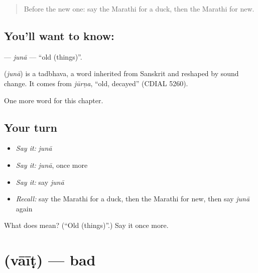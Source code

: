 \label{lesson:MR-C103-juna}



\begin{quote}
Before the new one: say the Marathi for a duck, then the Marathi for new.
\end{quote}

\subsection*{You'll want to know: }
\textbf{} — \emph{junā} — \textquotedblleft{}old (things)\textquotedblright{}.

\begin{cousinweb}
\textbf{} (\emph{junā}) is a tadbhava, a word inherited from Sanskrit and reshaped by sound change. It comes from \emph{jūrṇa}, \textquotedblleft{}old, decayed\textquotedblright{} (CDIAL 5260).
\end{cousinweb}

\begin{grammarlens}[title={What you've built}]
One more word for this chapter.
\end{grammarlens}

\subsection*{Your turn}
\begin{itemize}
\raggedright
  \item \emph{Say it:} \emph{junā}
  \item \emph{Say it:} \emph{junā}, once more
  \item \emph{Say it:} say \emph{junā}
  \item \emph{Recall:} say the Marathi for a duck, then the Marathi for new, then say \emph{junā} again
\end{itemize}

\begin{tcolorbox}[breakable,colback=teal!4,colframe=teal!35!black,title={Before you move on}]
What does  mean? (\textquotedblleft{}Old (things)\textquotedblright{}.) Say it once more.
\end{tcolorbox}
\section[\texorpdfstring{\mr{वाईट} (vāīṭ)}{वाईट (vāīṭ)}]{ (vāīṭ) — bad}

\label{lesson:MR-C103-vait}



